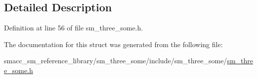 \subsection{Detailed Description}


Definition at line 56 of file sm\+\_\+three\+\_\+some.\+h.



The documentation for this struct was generated from the following file\+:\begin{DoxyCompactItemize}
\item 
smacc\+\_\+sm\+\_\+reference\+\_\+library/sm\+\_\+three\+\_\+some/include/sm\+\_\+three\+\_\+some/\hyperlink{sm__three__some_8h}{sm\+\_\+three\+\_\+some.\+h}\end{DoxyCompactItemize}
